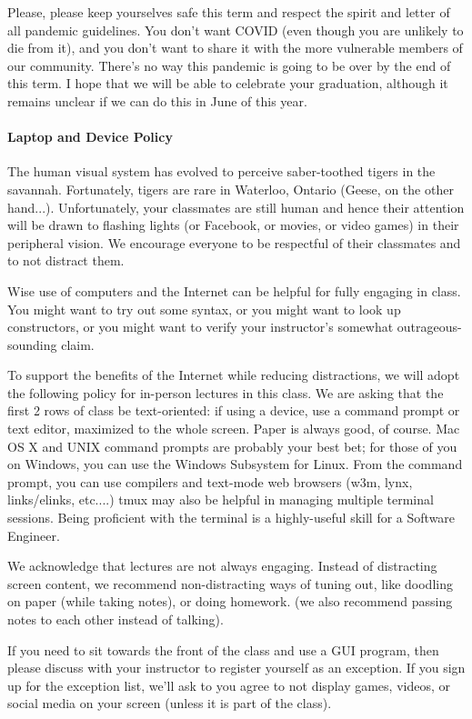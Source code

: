 \documentclass[letterpaper,10pt]{article}
\begin{document}
Please, please keep yourselves safe this term and respect the spirit and letter of all pandemic guidelines. You don't want COVID (even though you are unlikely to die from it), and you don't want to share it with the more vulnerable members of our community. There's no way this pandemic is going to be over by the end of this term. I hope that we will be able to celebrate your graduation, although it remains unclear if we can do this in June of this year. 

\paragraph{Laptop and Device Policy}
The human visual system has evolved to perceive saber-toothed tigers
in the savannah. Fortunately, tigers are rare in Waterloo, Ontario
(Geese, on the other hand...).
Unfortunately, your classmates are still human and hence their
attention will be drawn to flashing lights (or Facebook, or movies, or
video games) in their peripheral vision. We encourage
everyone to be respectful of their classmates and to not distract them.

Wise use of computers and the Internet can be helpful for fully
engaging in class. You might want to try out some syntax, or you might
want to look up constructors, or you might want to verify your
instructor's somewhat outrageous-sounding claim.

To support the benefits of the Internet while reducing distractions,
we will adopt the following policy for in-person lectures in this class. We are asking that the
first 2 rows of class be text-oriented: if using a device, use a
command prompt or text editor, maximized to the whole screen. Paper is
always good, of course. Mac OS X and UNIX command prompts are probably
your best bet; for those of you on Windows, you can use the Windows
Subsystem for Linux. From the command prompt, you can use compilers
and text-mode web browsers (w3m, lynx, links/elinks, etc....) tmux may
also be helpful in managing multiple terminal sessions. Being
proficient with the terminal is a highly-useful skill for a Software
Engineer.

We acknowledge that lectures are not always engaging. Instead of
distracting screen content, we recommend non-distracting ways of tuning
out, like doodling on paper (while taking notes), or doing homework.
(we also recommend passing notes to each other instead of talking).

If you need to sit towards the front of the class and use a GUI
program, then please discuss with your instructor to register
yourself as an exception. If you sign up for
the exception list, we'll ask to you agree to not display games,
videos, or social media on your screen (unless it is part of the
class).
\end{document}
